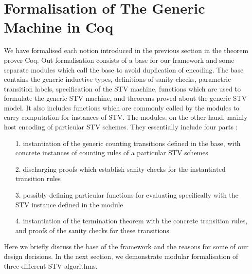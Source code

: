 \documentclass{llncs}
\begin{document}
\section{Formalisation of The Generic Machine in Coq}
We have formalised each notion introduced in the previous section in the theorem prover Coq. Out formalisation consists of a base for our framework and some separate modules which call the base to avoid duplication of encoding. The base contains the generic inductive types, definitions of sanity checks, parametric transition labels, specification of the STV machine, functions which are used to formulate the generic STV machine, and theorems proved about the generic STV model. It also includes functions which are commonly called by the modules to carry computation for instances of STV. The modules, on the other hand, mainly host encoding of particular STV schemes. They essentially include four parts :
\begin{itemize}
\item[1.] instantiation of the generic counting transitions defined in the base, with concrete instances of counting rules of a particular STV schemes
\item[2.] discharging proofs which establish sanity checks for the instantiated transition rules
\item[3.] possibly defining particular functions for evaluating specifically with the STV instance defined in the module
\item[4.] instantiation of the termination theorem with the concrete transition rules, and proofs of the sanity checks for these transitions.
\end{itemize}       
Here we  briefly discuss the base of the framework and the reasons for some of our design decisions. In the next section, we demonstrate  modular formalisation of three different STV algorithms.  
\end{document}
